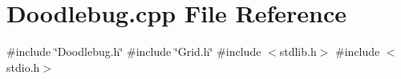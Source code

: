 \section{Doodlebug.\+cpp File Reference}
\label{Doodlebug_8cpp}
{\ttfamily \#include \char`\"{}Doodlebug.\+h\char`\"{}}\newline
{\ttfamily \#include \char`\"{}Grid.\+h\char`\"{}}\newline
{\ttfamily \#include $<$stdlib.\+h$>$}\newline
{\ttfamily \#include $<$stdio.\+h$>$}\newline

